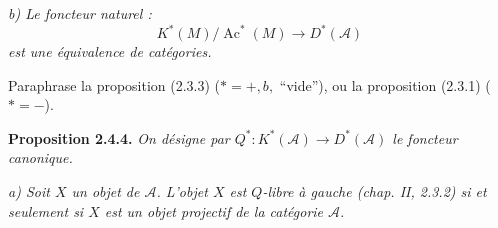 \noindent\textit{b) Le foncteur naturel :}
\[
K^{*}(M)/\operatorname{Ac}^{*}(M)\longrightarrow D^{*}(\mathcal A)
\]
\noindent\textit{est une équivalence de catégories.}

Paraphrase la proposition (2.3.3) ($*=+,b,{}$ ``vide''), ou la proposition
(2.3.1) ($*=-$).

\medskip\noindent\textbf{Proposition 2.4.4.}\quad
\textit{On désigne par
$Q^{*}\colon K^{*}(\mathcal A)\longrightarrow D^{*}(\mathcal A)$ le
foncteur canonique.}

\noindent\textit{a) Soit $X$ un objet de $\mathcal A$. L'objet $X$ est
$Q$-libre à gauche (chap. II, 2.3.2) si et seulement si $X$ est un objet
projectif de la catégorie $\mathcal A$.}
\endgroup
